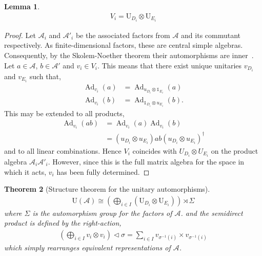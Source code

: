\documentclass[11pt, twocolumn, floatfix, superscriptaddress, aps, prb, raggedbottom]{revtex4-2}
\newtheorem{theorem}{Theorem}[section]
\newtheorem{lemma}[theorem]{Lemma}
\DeclareMathOperator{\Ad}{Ad}
\begin{document}
\begin{lemma}
  \begin{align}
    V_i = \mathrm{U}_{D_i} \otimes \mathrm{U}_{E_i}
  \end{align}
\end{lemma}
\begin{proof}
    Let $\mathcal{A}_i$ and $\mathcal{A}'_i$ be the associated factors from $\mathcal{A}$ and its commutant respectively.
    As finite-dimensional factors, these are central simple algebras.
    Consequently, by the Skolem-Noether theorem their automorphisms are inner~\cite{FarbDennis2016NoncommutativeAlgebra}.
    Let $a \in \mathcal{A}$, $b \in \mathcal{A}'$ and $v_i \in V_i$.
    This means that there exist unique unitaries $v_{D_i}$ and $v_{E_i}$ such that,
    \begin{align}
        \Ad_{v_i} (a) &= \Ad_{u_{D_i} \otimes \mathds{1}_{E_i}} (a) \\
        \Ad_{v_i} (b) &= \Ad_{\mathds{1}_{D_i} \otimes u_{E_i}} (b)\text{.}
    \end{align}
    This may be extended to all products,
    \begin{align}
        \Ad_{v_i} (ab)
        &= \Ad_{v_i} (a) \Ad_{v_i} (b) \\
        &= (u_{D_i} \otimes u_{E_i}) a b (u_{D_i} \otimes u_{E_i})^\dagger
    \end{align}
    and to all linear combinations.
    Hence $V_i$ coincides with $U_{D_i} \otimes U_{E_i}$ on the product algebra $\mathcal{A}_i \mathcal{A}'_i$.
    However, since this is the full matrix algebra for the space in which it acts, $v_i$ has been fully determined.
\end{proof}

\begin{theorem}[Structure theorem for the unitary automorphisms]
  \begin{align}
    \mathrm{U}(\mathcal{A}) \cong \left( \bigoplus_{i \in I} \left(\mathrm{U}_{D_i} \otimes \mathrm{U}_{E_i} \right)\right) \rtimes \Sigma
  \end{align}
  where $\Sigma$ is the automorphism group for the factors of $\mathcal{A}$.
  and the semidirect product is defined by the right-action,
  \begin{align}
    \left(\bigoplus_{i \in I} v_i \otimes v_i\right) \triangleleft \sigma = \sum_{i \in I} v_{\sigma^{-1}(i)} \times v_{\sigma^{-1}(i)}
  \end{align}
  which simply rearranges equivalent representations of $\mathcal{A}$.
\end{theorem}
\end{document}
